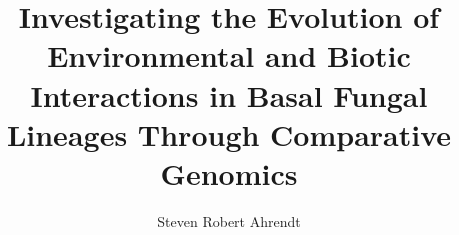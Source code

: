 \documentclass[11pt]{UCR_latex_template/ucr}
\begin{document}


\title{Investigating the Evolution of Environmental and Biotic Interactions in Basal Fungal Lineages Through Comparative Genomics}
\author{Steven Robert Ahrendt}

\maketitle
\copyrightpage{}
\approvalpage{}

\end{document}
